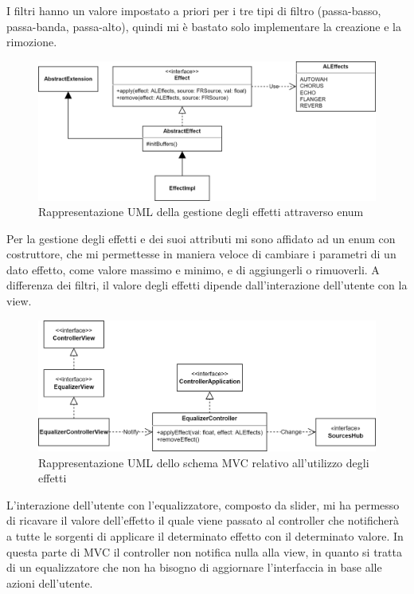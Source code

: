 \documentclass[a4paper,12pt]{report}
\begin{document}
I filtri hanno un valore impostato a priori per i tre tipi di filtro (passa-basso, passa-banda, passa-alto), quindi mi è bastato solo implementare la creazione e la rimozione. 
%
\begin{figure}[H]
\centering{}
\includegraphics[width=\textwidth]{img/extension/Effect.png}
\caption{Rappresentazione UML della gestione degli effetti attraverso enum}
\label{img:effects}
\end{figure}
Per la gestione degli effetti e dei suoi attributi mi sono affidato ad un enum con costruttore, che mi permettesse in maniera veloce di cambiare i parametri di un dato effetto, come valore massimo e minimo, e di aggiungerli o rimuoverli. A differenza dei filtri, il valore degli effetti dipende dall’interazione dell’utente con la view.
%
\begin{figure}[H]
\centering{}
\includegraphics[width=\textwidth]{img/extension/EffectsMVC.png}
\caption{Rappresentazione UML dello schema MVC relativo all’utilizzo degli effetti}
\label{img:effectsmvc}
\end{figure}
L’interazione dell’utente con l’equalizzatore, composto da slider, mi ha permesso di ricavare il valore dell’effetto il quale viene passato al controller che notificherà a tutte le sorgenti di applicare il determinato effetto con il determinato valore. In questa parte di MVC il controller non notifica nulla alla view, in quanto si tratta di un equalizzatore che non ha bisogno di aggiornare l’interfaccia in base alle azioni dell’utente.
%
\end{document}
